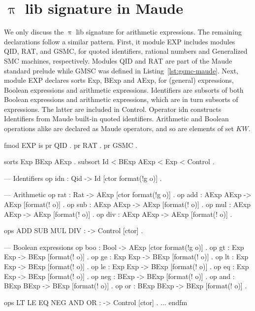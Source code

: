 \documentclass[a4paper,openany]{book}
\begin{document}
\section{$\uppi$ lib signature in Maude}\label{sec:uppi-lib-sig-maude}

We only discuss the $\uppi$ lib signature for arithmetic expressions. %
The remaining declarations follow a similar pattern. First, it module EXP includes modules QID, RAT, and GSMC, for quoted identifiers, rational numbers and Generalized SMC machines, respectively.  Modules QID and RAT are part of the Maude standard prelude while GMSC was defined in Listing~\ref{lst:gsmc-maude}. Next, module EXP declares sorts Exp, BExp and AExp, for (general) expressions, Boolean expressions and arithmetic expressions. Identifiers are subsorts of both Boolean expressions and arithmetic expressions, which are in turn subsorts of expressions. The latter are included in Control. Operator idn constructs Identifiers from Maude built-in quoted identifiers. Arithmetic and Boolean operations alike are declared as Maude operators, and so are elements of set $\mathit{KW}$.    

\begin{maude}[caption=Signature for $\uppi$ lib  expressions in Maude, label=lst:uppi-lib-exp-sig]
fmod EXP is
    pr QID . pr RAT .
    pr GSMC .
      
    sorts Exp BExp AExp .
    subsort Id < BExp AExp < Exp < Control .

    --- Identifiers
    op idn : Qid -> Id [ctor format(!g o)] .

    --- Arithmetic
    op rat : Rat -> AExp [ctor format(!g o)] .
    op add : AExp AExp -> AExp [format(! o)] .
    op sub : AExp AExp -> AExp [format(! o)] .
    op mul : AExp AExp -> AExp [format(! o)] .
    op div : AExp AExp -> AExp [format(! o)] .

    ops ADD SUB MUL DIV : -> Control [ctor] .

    --- Boolean expressions
    op boo : Bool -> AExp [ctor format(!g o)] .
    op gt : Exp Exp -> BExp [format(! o)] .
    op ge : Exp Exp -> BExp [format(! o)] .
    op lt : Exp Exp -> BExp [format(! o)] .
    op le : Exp Exp -> BExp [format(! o)] .
    op eq : Exp Exp -> BExp [format(! o)] .
    op neg : BExp -> BExp [format(! o)] .
    op and : BExp BExp -> BExp [format(! o)] .
    op or : BExp BExp -> BExp [format(! o)] .

    ops LT LE EQ NEG AND OR : -> Control [ctor] .
    $\ldots$
 endfm
 \end{maude}
\end{document}
